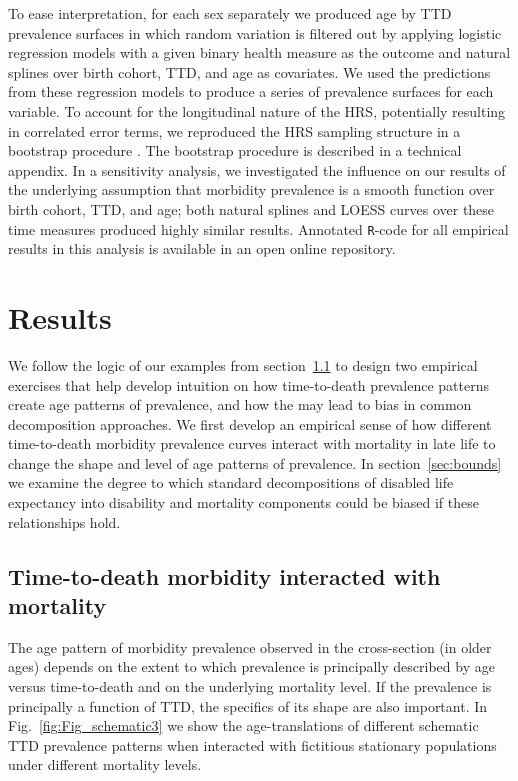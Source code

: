 \documentclass[12pt,oneside,letterpaper,doublespacing]{article}  %
\begin{document}
To ease interpretation, for each sex separately we produced age by TTD prevalence surfaces in which
random variation is filtered out by applying logistic regression models with a
given binary health measure as the outcome and natural splines over birth cohort,
TTD, and age as covariates. We used the predictions from these regression models
to produce a series of prevalence surfaces for each variable. To account for the
longitudinal nature of the HRS, potentially resulting in correlated error terms,
we reproduced the HRS sampling structure in a bootstrap procedure
\citep{efron1994introduction}. The bootstrap procedure is described in a technical appendix. In a sensitivity analysis, we investigated the influence on our results of the underlying assumption that morbidity prevalence is a smooth function over birth cohort, TTD, and age; both natural splines and LOESS curves over these time measures \citep{riffe2017ttd} produced highly similar results. Annotated \texttt{R}-code for all empirical results in this analysis is available in an open online repository.
% 

\section{Results}
\label{sec:ttdok}
We follow the logic of our examples from section~\ref{sec:schematic} to design two empirical exercises that help develop intuition on how time-to-death prevalence patterns create age patterns of prevalence, and how the may lead to bias in common decomposition approaches. We first develop an empirical sense of how different time-to-death morbidity prevalence curves interact with mortality in late life to change the shape and level of age patterns of prevalence. In section~\ref{sec:bounds} we examine the degree to which standard decompositions of disabled life expectancy into disability and mortality components could be biased if these relationships hold.
\FloatBarrier
\subsection{Time-to-death morbidity interacted with mortality}
\label{sec:schematic}
The age pattern of morbidity prevalence observed in the cross-section (in older ages) depends
on the extent to which prevalence is principally described by
age versus time-to-death and on the underlying mortality
level. If the prevalence is principally a function of TTD, the
specifics of its shape are also important. In Fig.~\ref{fig:Fig_schematic3} we
show the age-translations of different schematic TTD prevalence patterns when
interacted with fictitious stationary populations under different mortality levels.
\end{document}
